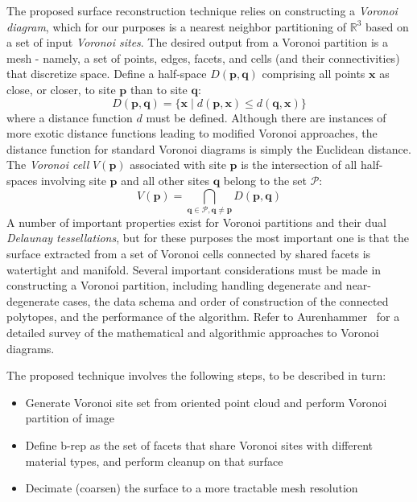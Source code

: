 The proposed surface reconstruction technique relies on constructing a \textit{Voronoi diagram}, which for our purposes is a nearest neighbor partitioning of $\mathbb{R}^3$ based on a set of input \textit{Voronoi sites}. The desired output from a Voronoi partition is a mesh - namely, a set of points, edges, facets, and cells (and their connectivities) that discretize space. Define a half-space $D(\bm{p},\bm{q})$ comprising all points $\bm{x}$ as close, or closer, to site $\bm{p}$ than to site $\bm{q}$:
\begin{equation}
D(\bm{p},\bm{q}) = \{\bm{x} \mid d(\bm{p},\bm{x}) \leq d(\bm{q},\bm{x})\}
\end{equation}
where a distance function $d$ must be defined. Although there are instances of more exotic distance functions leading to modified Voronoi approaches, the distance function for standard Voronoi diagrams is simply the Euclidean distance. The \textit{Voronoi cell} $V(\bm{p})$ associated with site $\bm{p}$ is the intersection of all half-spaces involving site $\bm{p}$ and all other sites $\bm{q}$ belong to the set $\mathcal{P}$:
\begin{equation}
V(\bm{p}) = \bigcap \limits_{\bm{q} \in \mathcal{P}, \bm{q} \neq \bm{p}} D(\bm{p},\bm{q})
\end{equation}
A number of important properties exist for Voronoi partitions and their dual \textit{Delaunay tessellations}, but for these purposes the most important one is that the surface extracted from a set of Voronoi cells connected by shared facets is watertight and manifold. Several important considerations must be made in constructing a Voronoi partition, including handling degenerate and near-degenerate cases, the data schema and order of construction of the connected polytopes, and the
performance of the algorithm. Refer to Aurenhammer~\cite{aurenhammer_1991} for a detailed survey of the mathematical and algorithmic approaches to Voronoi diagrams.

The proposed technique involves the following steps, to be described in turn:
\begin{itemize}[noitemsep]
\item Generate Voronoi site set from oriented point cloud and perform Voronoi partition of image
\item Define b-rep as the set of facets that share Voronoi sites with different material types, and perform cleanup on that surface
\item Decimate (coarsen) the surface to a more tractable mesh resolution
\end{itemize}

